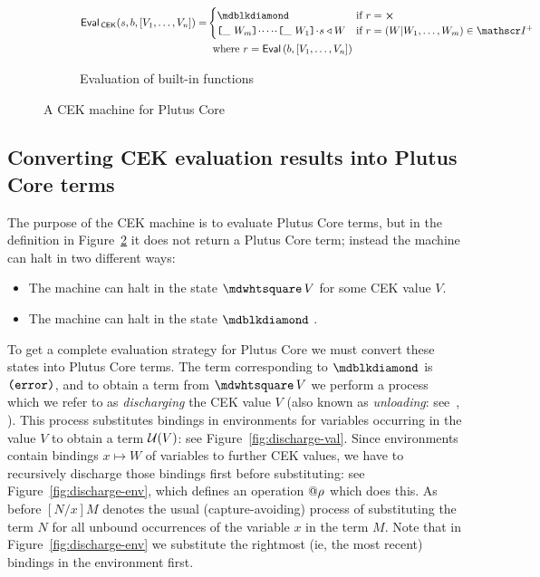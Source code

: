 \begin{figure}[H]
\bigskip
\begin{subfigure}[c]{\linewidth}
  \begin{align*}
 \EvalCEK(s, b, [V_1, \ldots, V_n]) =
  &   \begin{cases}
        \cekerror  & \text{if $r = \errorX$}\\
        \inAppLeftFrame{W_m} \cons \cdots \cons \inAppLeftFrame{W_1} \cons s \return W & \text{if $r = (W|W_1,\ldots,W_m) \in \Inputs^{+}$}
      \end{cases}\\
  &  \;\;\text{where $r = \Eval\,(b,[V_1, \ldots, V_n])$}\\
   \end{align*}
  \caption{Evaluation of built-in functions}
  \label{fig:untyped-cek-builtins}
\end{subfigure}

  \caption{A CEK machine for Plutus Core }
\label{fig:untyped-cek-machine}
\end{figure}
  
\subsection{Converting CEK evaluation results into Plutus Core terms}
The purpose of the CEK machine is to evaluate Plutus Core terms, but in the
definition in Figure~\ref{fig:untyped-cek-machine} it does not return a Plutus
Core term; instead the machine can halt in two different ways:
\begin{itemize}
\item The machine can halt in the state $\cekhalt{V}$ for some CEK value $V$.
\item The machine can halt in the state $\cekerror{}$ .
\end{itemize}

\noindent To get a complete evaluation strategy for Plutus Core we must convert
these states into Plutus Core terms.  The term corresponding to $\cekerror{}$ is
$\texttt{(} \texttt{error} \texttt{)}$, and to obtain a term from $\cekhalt{V}$ we perform a process which we
refer to as \textit{discharging} the CEK value $V$ (also known as
\textit{unloading}: see~\cite[pp. 129--130]{Plotkin-cbn-cbv},
\cite[pp. 71ff]{Felleisen-pllc}).  This process substitutes bindings in
environments for variables occurring in the value $V$ to obtain a term
$\mathcal{U}(V)$: see Figure~\ref{fig:discharge-val}.  Since environments contain
bindings $x \mapsto W$ of variables to further CEK values, we have to
recursively discharge those bindings first before substituting: see
Figure~\ref{fig:discharge-env}, which defines an operation ${}@{\rho}$ which
does this.  As before $[N/x]M$ denotes the usual (capture-avoiding) process of
substituting the term $N$ for all unbound occurrences of the variable $x$ in the
term $M$. Note that in Figure~\ref{fig:discharge-env} we substitute the
rightmost (ie, the most recent) bindings in the environment first.

